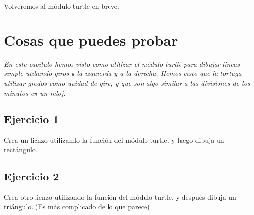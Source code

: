\noindent
Volveremos al módulo turtle en breve.

\section{Cosas que puedes probar}

\emph{En este capítulo hemos visto como utilizar el módulo turtle para dibujar lineas simple utiliando giros a la izquierda y a la derecha.  Hemos visto que la tortuga utilizar grados como unidad de giro, y que son algo similar a las divisiones de los minutos en un reloj.}

\subsection*{Ejercicio 1}
Crea un lienzo utilizando la función  del módulo turtle, y luego dibuja un rectángulo.

\subsection*{Ejercicio 2}
Crea otro lienzo utilizando la función  del módulo turtle, y después dibuja un triángulo. (Es más complicado de lo que parece)

\newpage
